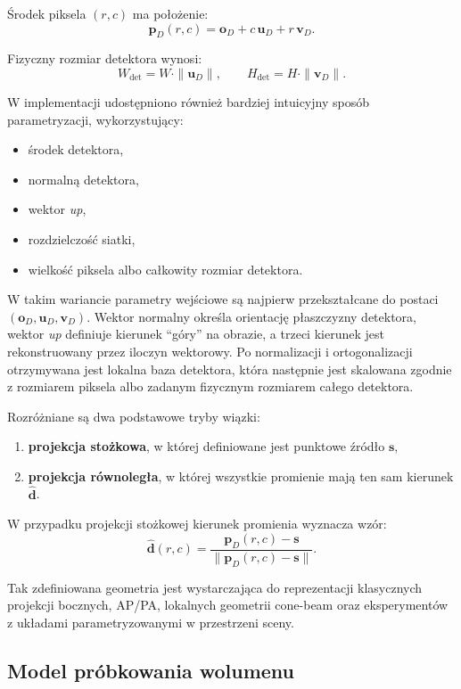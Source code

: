 \documentclass[11pt,a4paper]{article}
\begin{document}
Środek piksela \((r,c)\) ma położenie:
\[
  \mathbf{p}_D(r,c)=\mathbf{o}_D + c\,\mathbf{u}_D + r\,\mathbf{v}_D.
\]

Fizyczny rozmiar detektora wynosi:
\[
  W_{\mathrm{det}} = W \cdot \|\mathbf{u}_D\|,
  \qquad
  H_{\mathrm{det}} = H \cdot \|\mathbf{v}_D\|.
\]

W implementacji udostępniono również bardziej intuicyjny sposób parametryzacji,
wykorzystujący:
\begin{itemize}
\item środek detektora,
\item normalną detektora,
\item wektor \emph{up},
\item rozdzielczość siatki,
\item wielkość piksela albo całkowity rozmiar detektora.
\end{itemize}

W takim wariancie parametry wejściowe są najpierw przekształcane do postaci
\((\mathbf{o}_D,\mathbf{u}_D,\mathbf{v}_D)\). Wektor normalny określa orientację
płaszczyzny detektora, wektor \emph{up} definiuje kierunek ``góry'' na obrazie,
a trzeci kierunek jest rekonstruowany przez iloczyn wektorowy. Po normalizacji
i ortogonalizacji otrzymywana jest lokalna baza detektora, która następnie jest
skalowana zgodnie z rozmiarem piksela albo zadanym fizycznym rozmiarem całego
detektora.

Rozróżniane są dwa podstawowe tryby wiązki:
\begin{enumerate}[label=\alph*)]
\item \textbf{projekcja stożkowa}, w której definiowane jest punktowe źródło
      \(\mathbf{s}\),
\item \textbf{projekcja równoległa}, w której wszystkie promienie mają ten sam
      kierunek \(\hat{\mathbf{d}}\).
\end{enumerate}

W przypadku projekcji stożkowej kierunek promienia wyznacza wzór:
\[
  \hat{\mathbf{d}}(r,c)=
  \frac{\mathbf{p}_D(r,c)-\mathbf{s}}
       {\|\mathbf{p}_D(r,c)-\mathbf{s}\|}.
\]

Tak zdefiniowana geometria jest wystarczająca do reprezentacji klasycznych
projekcji bocznych, AP/PA, lokalnych geometrii cone-beam oraz eksperymentów
z układami parametryzowanymi w przestrzeni sceny.

\subsection{Model próbkowania wolumenu}
\end{document}
